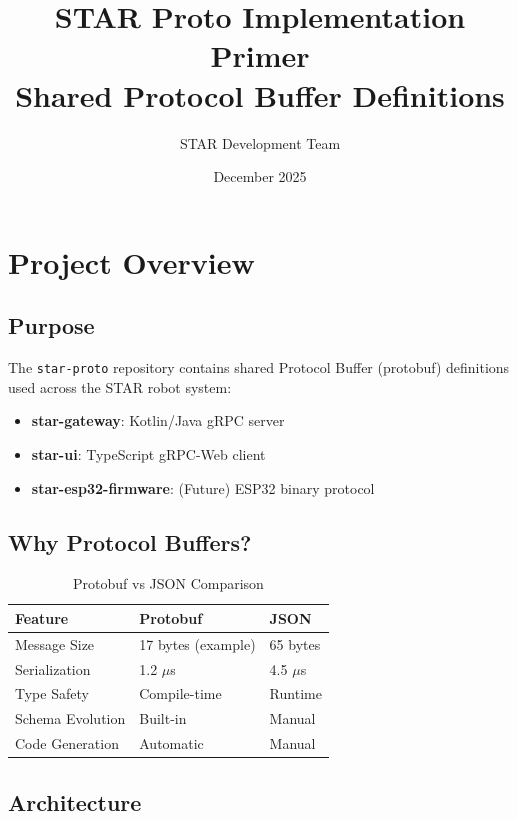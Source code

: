 \documentclass[11pt,letterpaper]{article}
\title{\textbf{STAR Proto Implementation Primer}\\[0.5cm]
\large Shared Protocol Buffer Definitions}
\author{STAR Development Team}
\date{December 2025}
\begin{document}
\maketitle
\tableofcontents
\newpage

\section{Project Overview}

\subsection{Purpose}

The \texttt{star-proto} repository contains shared Protocol Buffer (protobuf) definitions used across the STAR robot system:

\begin{itemize}
    \item \textbf{star-gateway}: Kotlin/Java gRPC server
    \item \textbf{star-ui}: TypeScript gRPC-Web client
    \item \textbf{star-esp32-firmware}: (Future) ESP32 binary protocol
\end{itemize}

\subsection{Why Protocol Buffers?}

\begin{table}[H]
\centering
\begin{tabular}{|l|l|l|}
\hline
\textbf{Feature} & \textbf{Protobuf} & \textbf{JSON} \\
\hline
Message Size & 17 bytes (example) & 65 bytes \\
Serialization & 1.2 $\mu$s & 4.5 $\mu$s \\
Type Safety & Compile-time & Runtime \\
Schema Evolution & Built-in & Manual \\
Code Generation & Automatic & Manual \\
\hline
\end{tabular}
\caption{Protobuf vs JSON Comparison}
\end{table}

\subsection{Architecture}
\end{document}
